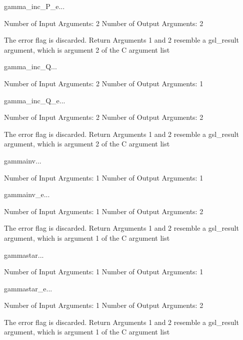 \begin{funcdesc}{gamma_inc_P_e}{...}

    Number of Input  Arguments:  2
    Number of Output Arguments:  2

The error flag is discarded.
Return Arguments 1 and 2 resemble a gsl_result argument,
	which is  argument 2 of the C argument list

\end{funcdesc}

\begin{funcdesc}{gamma_inc_Q}{...}

    Number of Input  Arguments:  2
    Number of Output Arguments:  1
\end{funcdesc}

\begin{funcdesc}{gamma_inc_Q_e}{...}

    Number of Input  Arguments:  2
    Number of Output Arguments:  2

The error flag is discarded.
Return Arguments 1 and 2 resemble a gsl_result argument,
	which is  argument 2 of the C argument list

\end{funcdesc}

\begin{funcdesc}{gammainv}{...}

    Number of Input  Arguments:  1
    Number of Output Arguments:  1
\end{funcdesc}

\begin{funcdesc}{gammainv_e}{...}

    Number of Input  Arguments:  1
    Number of Output Arguments:  2

The error flag is discarded.
Return Arguments 1 and 2 resemble a gsl_result argument,
	which is  argument 1 of the C argument list

\end{funcdesc}

\begin{funcdesc}{gammastar}{...}

    Number of Input  Arguments:  1
    Number of Output Arguments:  1
\end{funcdesc}

\begin{funcdesc}{gammastar_e}{...}

    Number of Input  Arguments:  1
    Number of Output Arguments:  2

The error flag is discarded.
Return Arguments 1 and 2 resemble a gsl_result argument,
	which is  argument 1 of the C argument list

\end{funcdesc}

